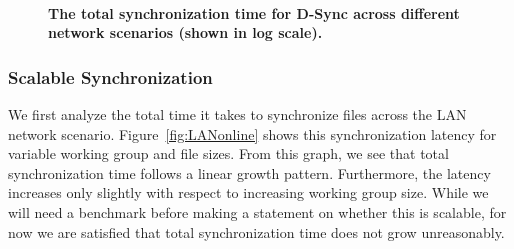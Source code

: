 \begin{figure}[t]
\centering
{}
~~~~
\caption{\textbf{The total synchronization time for D-Sync across different network scenarios (shown in log scale).}}
\end{figure}

\subsubsection{Scalable Synchronization}
We first analyze the total time it takes to synchronize files
across the LAN network scenario.  Figure~\ref{fig:LANonline} 
shows this synchronization latency for variable working group and
file sizes. From this graph,
we see that total synchronization time follows a linear growth pattern.
Furthermore, the latency increases only slightly with respect
to increasing working group size.
While we will need a benchmark before making a statement
on whether this is scalable,
for now we are satisfied that total synchronization time
    does not grow unreasonably.

